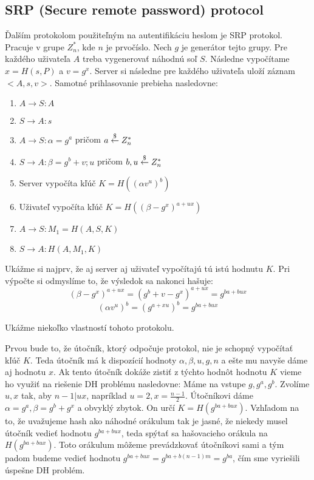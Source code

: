 \subsection{SRP (Secure remote password) protocol}

Ďalším protokolom použiteľným na autentifikáciu heslom je SRP protokol.
Pracuje v grupe $Z_n^{*}$, kde $n$ je prvočíslo. Nech $g$ je generátor
tejto grupy. Pre každého uživateľa $A$ treba vygenerovať náhodnú soľ
$S$. Následne vypočítame $x = H(s,P)$ a $v = g^x$. Server si následne
pre každého uživateľa uloží záznam $<A, s, v>$.
Samotné prihlasovanie prebieha nasledovne:
\begin{enumerate}
\item $A\to S\colon A$
\item $S\to A\colon s$
\item $A\to S\colon \alpha = g^a$ pričom $ a\overset{\$}{\leftarrow} Z_n^{*}$
\item $S\to A\colon \beta = g^b + v; u$ pričom $b,u \overset{\$}{\leftarrow} Z_n^{*}$
\item Server vypočíta kľúč $K = H((\alpha v^u)^b)$
\item Uživateľ vypočíta kľúč $K = H((\beta - g^x)^{a+ux})$
\item $A\to S\colon M_1 = H(A,S,K)$
\item $S\to A\colon H(A,M_1,K)$
\end{enumerate}

Ukážme si najprv, že aj server aj uživateľ vypočítajú tú istú hodnutu $K$.
Pri výpočte si odmyslíme to, že výsledok sa nakonci hašuje:
$$(\beta - g^x)^{a+ux} = (g^b + v - g^x)^{a+ux} = g^{ba+bux}$$
$$(\alpha v^u)^b = (g^{a+xu})^b = g^{ba+bux}$$

Ukážme niekoľko vlastností tohoto protokolu.

Prvou bude to, že útočník, ktorý odpočuje protokol, nie je schopný vypočítať kľúč
$K$. Teda útočník má k dispozícií hodnoty $\alpha, \beta, u, g, n$ a ešte mu navyše
dáme aj hodnotu $x$. Ak tento útočník dokáže zistiť z týchto hodnôt hodnotu $K$
vieme ho využiť na riešenie DH problému nasledovne:
Máme na vstupe $g, g^a, g^b$. Zvolíme $u,x$ tak, aby $n-1 | ux$, napríklad
$u = 2, x = \frac{n-1}{2}$. Útočníkovi dáme $\alpha = g^a, \beta = g^b + g^x$ a obvyklý
zbytok. On určí $K = H(g^{ba+bux})$. 
Vzhľadom na to, že uvažujeme hash ako náhodné orákulum tak je jasné, že niekedy musel útočník
vedieť hodnotu $g^{ba+bux}$, teda spýtať sa hašovacieho orákula na $H(g^{ba+bux})$.
Toto orákulum môžeme prevádzkovať útočníkovi sami a tým padom budeme vedieť hodnotu
$g^{ba+bux} = g^{ba+b(n-1)m} = g^{ba}$, čím sme vyriešili úspešne DH problém.

